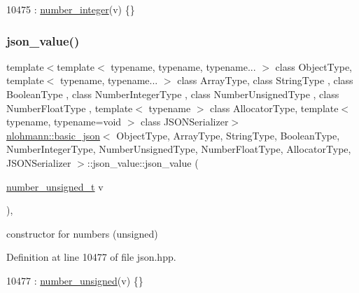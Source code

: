 \begin{DoxyCode}
10475 : \hyperlink{unionnlohmann_1_1basic__json_1_1json__value_afa3c414445aeffb56a7c6926f9420941}{number\_integer}(v) \{\}
\end{DoxyCode}
\mbox{\label{unionnlohmann_1_1basic__json_1_1json__value_a0bac352145b02ec3dd280bbfef997a55}} 
\subsubsection{\texorpdfstring{json\+\_\+value()}{json\_value()}\hspace{0.1cm}{\footnotesize\ttfamily [4/12]}}
{\footnotesize\ttfamily template$<$template$<$ typename, typename, typename... $>$ class Object\+Type, template$<$ typename, typename... $>$ class Array\+Type, class String\+Type , class Boolean\+Type , class Number\+Integer\+Type , class Number\+Unsigned\+Type , class Number\+Float\+Type , template$<$ typename $>$ class Allocator\+Type, template$<$ typename, typename=void $>$ class J\+S\+O\+N\+Serializer$>$ \\
\hyperlink{classnlohmann_1_1basic__json}{nlohmann\+::basic\+\_\+json}$<$ Object\+Type, Array\+Type, String\+Type, Boolean\+Type, Number\+Integer\+Type, Number\+Unsigned\+Type, Number\+Float\+Type, Allocator\+Type, J\+S\+O\+N\+Serializer $>$\+::json\+\_\+value\+::json\+\_\+value (\begin{DoxyParamCaption}\item[{\hyperlink{classnlohmann_1_1basic__json_ab906e29b5d83ac162e823ada2156b989}{number\+\_\+unsigned\+\_\+t}}]{v }\end{DoxyParamCaption})\hspace{0.3cm}{\ttfamily [inline]}, {\ttfamily [noexcept]}}



constructor for numbers (unsigned) 



Definition at line 10477 of file json.\+hpp.


\begin{DoxyCode}
10477 : \hyperlink{unionnlohmann_1_1basic__json_1_1json__value_a0299a6aa3bc4d45d54130e52970f73d3}{number\_unsigned}(v) \{\}
\end{DoxyCode}
\mbox{\label{unionnlohmann_1_1basic__json_1_1json__value_a39a41858abe635623710e1b0ce827593}} 
